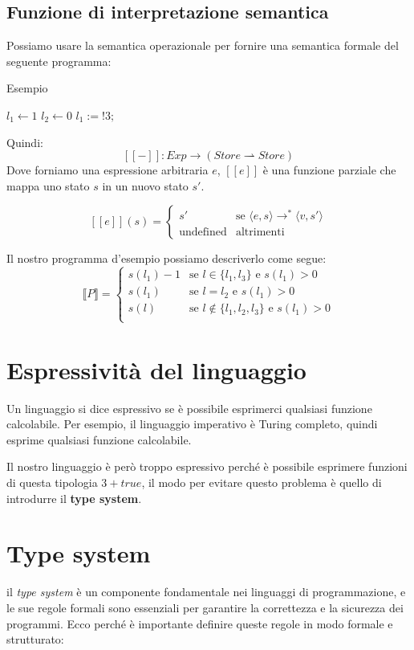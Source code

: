 \subsection{Funzione di interpretazione semantica}
Possiamo usare la semantica operazionale per fornire una semantica 
formale del seguente programma:
\begin{algorithm}
  \caption{Esempio}
  $l_1 \leftarrow 1$\;
  $l_2 \leftarrow 0$\;
  $l_1 := !3;$
\end{algorithm}
Quindi:
\[
  [\![ - ]\!]: Exp \rightarrow (Store \rightharpoonup Store)
\]
Dove forniamo una espressione arbitraria $e$, $[\![e]\!]$ è una 
funzione parziale che mappa uno stato $s$ in un nuovo stato $s'$.
\begin{tcolorbox}[title={Definizione}]
  \[
    [\![e]\!](s) = 
    \begin{cases}
      s' & \text{se } \langle e, s \rangle \rightarrow^* \langle v, s' \rangle \\
      \text{undefined} & \text{altrimenti}
    \end{cases}
  \]
\end{tcolorbox}
Il nostro programma d'esempio possiamo descriverlo come segue:
\[
  \llbracket P \rrbracket = 
  \begin{cases}
    s(l_1) - 1 & \text{se } l \in \{l_1, l_3\} \text{ e } s(l_1) > 0\\
    s(l_1) & \text{se } l = l_2 \text{ e } s(l_1) > 0 \\
    s(l) & \text{se } l \not \in \{l_1, l_2, l_3\} \text{ e } s(l_1) > 0\\
  \end{cases}
\]
\section{Espressività del linguaggio}
Un linguaggio si dice espressivo se è possibile esprimerci qualsiasi funzione
calcolabile. Per esempio, il linguaggio imperativo è Turing completo, quindi
esprime qualsiasi funzione calcolabile.

Il nostro linguaggio è però troppo espressivo perché è possibile esprimere
funzioni di questa tipologia $3 + true$, il modo per evitare 
questo problema è quello di introdurre il \textbf{type system}.
\section{Type system}
il \textit{type system} è un componente fondamentale nei linguaggi di programmazione, e le sue regole formali sono essenziali per garantire la correttezza e la sicurezza dei programmi. Ecco perché è importante definire queste regole in modo formale e strutturato:

